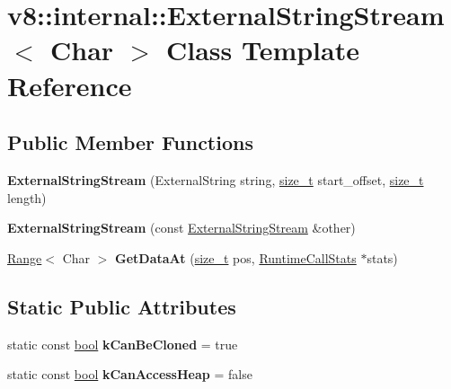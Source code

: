 \hypertarget{classv8_1_1internal_1_1ExternalStringStream}{}\section{v8\+:\+:internal\+:\+:External\+String\+Stream$<$ Char $>$ Class Template Reference}
\label{classv8_1_1internal_1_1ExternalStringStream}
\subsection*{Public Member Functions}
\begin{DoxyCompactItemize}
\item 
\mbox{\label{classv8_1_1internal_1_1ExternalStringStream_a0ed10b1d0ce6ce31166fe0666cbd31a6}} 
{\bfseries External\+String\+Stream} (External\+String string, \mbox{\hyperlink{classsize__t}{size\+\_\+t}} start\+\_\+offset, \mbox{\hyperlink{classsize__t}{size\+\_\+t}} length)
\item 
\mbox{\label{classv8_1_1internal_1_1ExternalStringStream_a8d13630609fce3dfe8f91cdc1fcfd650}} 
{\bfseries External\+String\+Stream} (const \mbox{\hyperlink{classv8_1_1internal_1_1ExternalStringStream}{External\+String\+Stream}} \&other)
\item 
\mbox{\label{classv8_1_1internal_1_1ExternalStringStream_a8b54952a1ef53340a46addfeddd47bb5}} 
\mbox{\hyperlink{structv8_1_1internal_1_1Range}{Range}}$<$ Char $>$ {\bfseries Get\+Data\+At} (\mbox{\hyperlink{classsize__t}{size\+\_\+t}} pos, \mbox{\hyperlink{classv8_1_1internal_1_1RuntimeCallStats}{Runtime\+Call\+Stats}} $\ast$stats)
\end{DoxyCompactItemize}
\subsection*{Static Public Attributes}
\begin{DoxyCompactItemize}
\item 
\mbox{\label{classv8_1_1internal_1_1ExternalStringStream_ae546e345ebe38ec0198ce94b89f62dd7}} 
static const \mbox{\hyperlink{classbool}{bool}} {\bfseries k\+Can\+Be\+Cloned} = true
\item 
\mbox{\label{classv8_1_1internal_1_1ExternalStringStream_a0939f6fb77656ce21f77a2955a5f8a3c}} 
static const \mbox{\hyperlink{classbool}{bool}} {\bfseries k\+Can\+Access\+Heap} = false
\end{DoxyCompactItemize}


